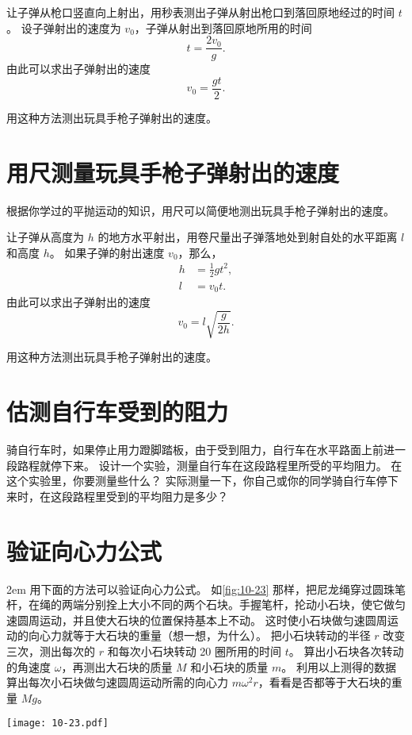让子弹从枪口竖直向上射出，用秒表测出子弹从射出枪口到落回原地经过的时间 $t$。
设子弹射出的速度为 $v_0$，子弹从射出到落回原地所用的时间
\[t=\frac{2v_0}{g}.\]
由此可以求出子弹射出的速度
\[v_0=\frac{gt}{2}.\]

用这种方法测出玩具手枪子弹射出的速度。

\section{用尺测量玩具手枪子弹射出的速度}
根据你学过的平抛运动的知识，用尺可以简便地测出玩具手枪子弹射出的速度。

让子弹从高度为 $h$ 的地方水平射出，用卷尺量出子弹落地处到射自处的水平距离 $l$ 和高度 $h$。
如果子弹的射出速度 $v_0$，那么，
\[\begin{split}
    h&=\frac{1}{2}gt^2,\\
    l&=v_0t.
\end{split}\]
由此可以求出子弹射出的速度
\[v_0=l \sqrt{\frac{g}{2h}}.\]

用这种方法测出玩具手枪子弹射出的速度。

\section{估测自行车受到的阻力}

骑自行车时，如果停止用力蹬脚踏板，由于受到阻力，自行车在水平路面上前进一段路程就停下来。
设计一个实验，测量自行车在这段路程里所受的平均阻力。
在这个实验里，你要测量些什么？
实际测量一下，你自己或你的同学骑自行车停下来时，在这段路程里受到的平均阻力是多少？

\section{验证向心力公式}
\noindent
\begin{minipage}{0.66\linewidth}\parindent2em
用下面的方法可以验证向心力公式。
如\cref{fig:10-23} 那样，把尼龙绳穿过圆珠笔杆，在绳的两端分别拴上大小不同的两个石块。手握笔杆，抡动小石块，使它做匀速圆周运动，并且使大石块的位置保持基本上不动。
这时使小石块做匀速圆周运动的向心力就等于大石块的重量（想一想，为什么）。
把小石块转动的半径 $r$ 改变三次，测出每次的 $r$ 和每次小石块转动 20 圈所用的时间 $t$。
算出小石块各次转动的角速度 $\omega$，再测出大石块的质量 $M$ 和小石块的质量 $m$。
利用以上测得的数据算出每次小石块做匀速圆周运动所需的向心力 $m\omega^2r$，看看是否都等于大石块的重量 $Mg$。
\end{minipage}\hfill
\begin{minipage}{0.33\linewidth}\centering
\begin{figurehere}
  \texttt{[image: 10-23.pdf]}
  \caption{}\label{fig:10-23}
\end{figurehere}
\end{minipage}

